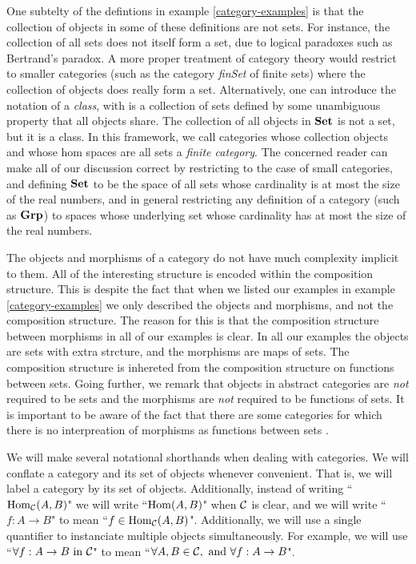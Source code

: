 \begin{warn}
One subtelty of the defintions in example \ref{category-examples} is that the collection of objects in some of these definitions are not sets. For instance, the collection of all sets does not itself form a set, due to logical paradoxes such as Bertrand's paradox. A more proper treatment of category theory would restrict to smaller categories (such as the category {\em finSet} of finite sets) where the collection of objects does really form a set. Alternatively, one can introduce the notation of a {\em class}, with is a collection of sets defined by some unambiguous property that all objects share. The collection of all objects in ${\bf Set}$ is not a set, but it is a class. In this framework, we call categories whose collection objects and whose hom spaces are all sets a {\em finite category}. The concerned reader can make all of our discussion correct by restricting to the case of small categories, and defining ${\bf Set}$ to be the space of all sets whose cardinality is at most the size of the real numbers, and in general restricting any definition of a category (such as ${\bf Grp}$) to spaces whose underlying set whose cardinality has at most the size of the real numbers.
\end{warn}

\begin{rem}The objects and morphisms of a category do not have much complexity implicit to them.  All of the interesting structure is encoded within the composition structure. This is despite the fact that when we listed our examples in example \ref{category-examples} we only described the objects and morphisms, and not the composition structure. The reason for this is that the composition structure between morphisms in all of our examples is clear. In all our examples the objects are sets with extra strcture, and the morphisms are maps of sets. The composition structure is inhereted from the composition structure on functions between sets. Going further, we remark that objects in abstract categories are {\em not} required to be sets and the morphisms are {\em not} required to be functions of sets. It is important to be aware of the fact that there are some categories for which there is no interpreation of morphisms as functions between sets \cite{freyd1970homotopy}.
\end{rem}

\begin{rem} We will make several notational shorthands when dealing with categories.  We will conflate a category and its set of objects whenever convenient. That is, we will label a category by its set of objects. Additionally, instead of writing ``$\operatorname{Hom}_{{\mathcal C}}(A,B)$" we will write ``$\operatorname{Hom}(A,B)$" when ${\mathcal C}$ is clear, and we will write ``$f:A\to B$" to mean ``$f\in \operatorname{Hom}_{{\mathcal C}}(A,B)$". Additionally, we will use a single quantifier to instanciate multiple objects simultaneously. For example, we will use ``$\forall f:A\to B \text{ in }{\mathcal C}$" to mean ``$\forall A,B\in {\mathcal C},\text{ and }\forall f:A\to B$".
\end{rem}

